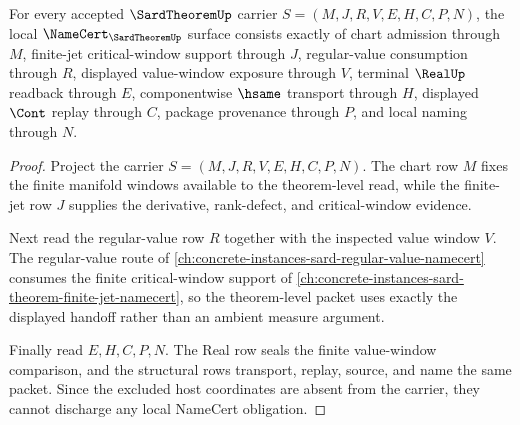 \begin{theorem}
\label{thm:sard-theorem-namecert-obligations}
For every accepted $\SardTheoremUp$ carrier $S=(M,J,R,V,E,H,C,P,N)$, the local $\NameCert_{\SardTheoremUp}$ surface consists exactly of chart admission through $M$, finite-jet critical-window support through $J$, regular-value consumption through $R$, displayed value-window exposure through $V$, terminal $\RealUp$ readback through $E$, componentwise $\hsame$ transport through $H$, displayed $\Cont$ replay through $C$, package provenance through $P$, and local naming through $N$.
\end{theorem}
\begin{proof}
Project the carrier $S=(M,J,R,V,E,H,C,P,N)$. The chart row $M$ fixes the finite manifold windows available to the theorem-level read, while the finite-jet row $J$ supplies the derivative, rank-defect, and critical-window evidence.

Next read the regular-value row $R$ together with the inspected value window $V$. The regular-value route of \autoref{ch:concrete-instances-sard-regular-value-namecert} consumes the finite critical-window support of \autoref{ch:concrete-instances-sard-theorem-finite-jet-namecert}, so the theorem-level packet uses exactly the displayed handoff rather than an ambient measure argument.

Finally read $E,H,C,P,N$. The Real row seals the finite value-window comparison, and the structural rows transport, replay, source, and name the same packet. Since the excluded host coordinates are absent from the carrier, they cannot discharge any local NameCert obligation.
\end{proof}

